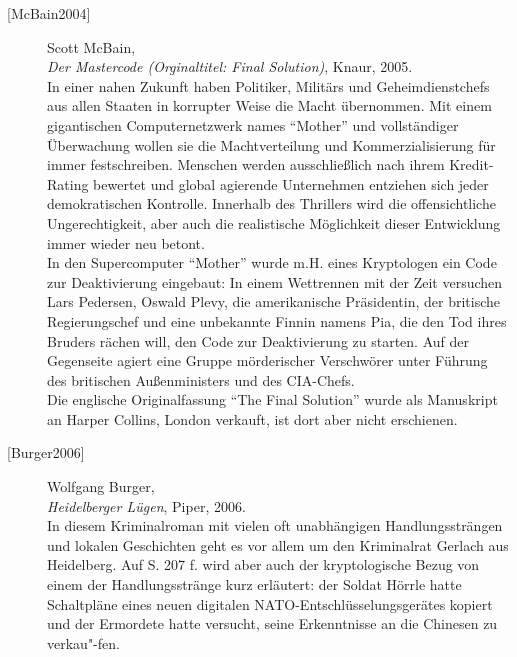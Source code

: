 \begin{refsegment}
\begin{description}
\item[\textrm{[McBain2004]}] 
    Scott McBain, \\
    {\em Der Mastercode (Orginaltitel: Final Solution)}, Knaur, 2005. \\
    In einer nahen Zukunft haben Politiker, Militärs und Geheimdienstchefs
    aus allen Staaten in korrupter Weise die Macht übernommen. Mit einem
    gigantischen Computernetzwerk names "`Mother"' und vollständiger
    Überwachung wollen sie die Machtverteilung und Kommerzialisierung für
    immer festschreiben.
    Menschen werden ausschließlich nach ihrem Kredit-Rating bewertet und
    global agierende Unternehmen entziehen sich jeder demokratischen
    Kontrolle.
    Innerhalb des Thrillers wird die offensichtliche Ungerechtigkeit,
    aber auch die realistische Möglichkeit dieser Entwicklung immer wieder
    neu betont.\\
    In den Supercomputer "`Mother"' wurde m.H. eines Kryptologen ein Code zur
    Deaktivierung eingebaut: In einem Wettrennen mit der Zeit versuchen
    Lars Pedersen, Oswald Plevy, die amerikanische Präsidentin, der britische
    Regierungschef und eine unbekannte Finnin namens Pia, die den Tod ihres
    Bruders rächen will, den Code zur Deaktivierung zu starten. Auf der
    Gegenseite agiert eine Gruppe mörderischer Verschwörer unter Führung
    des britischen Außenministers und des CIA-Chefs.\\
    Die englische Originalfassung "`The Final Solution"' wurde als Manuskript
    an Harper Collins, London verkauft, ist dort aber nicht erschienen.\\

	
\item[\textrm{[Burger2006]}] 
    Wolfgang Burger, \\
    {\em Heidelberger Lügen}, Piper, 2006. \\
    In diesem Kriminalroman mit vielen oft
    unabhängigen Handlungssträngen und lokalen Geschichten geht es vor
    allem um den Kriminalrat Gerlach aus Heidelberg. Auf S. 207 f. wird aber
    auch der kryptologische Bezug von einem der Handlungsstränge kurz
    erläutert: der Soldat Hörrle hatte Schaltpläne eines neuen digitalen
    NATO-Entschlüsselungsgerätes kopiert und der Ermordete hatte versucht,
    seine Erkenntnisse an die Chinesen zu verkau"-fen.\\



\end{description}
\end{refsegment}
